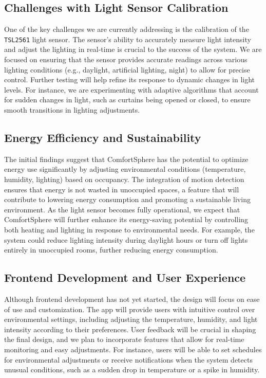 \documentclass[a4paper]{scrartcl}
\begin{document}
\subsection{Challenges with Light Sensor Calibration}  
One of the key challenges we are currently addressing is the calibration of the \texttt{TSL2561} light sensor. The sensor's ability to accurately measure light intensity and adjust the lighting in real-time is crucial to the success of the system. We are focused on ensuring that the sensor provides accurate readings across various lighting conditions (e.g., daylight, artificial lighting, night) to allow for precise control. Further testing will help refine its response to dynamic changes in light levels. For instance, we are experimenting with adaptive algorithms that account for sudden changes in light, such as curtains being opened or closed, to ensure smooth transitions in lighting adjustments.

\subsection{Energy Efficiency and Sustainability}  
The initial findings suggest that ComfortSphere has the potential to optimize energy use significantly by adjusting environmental conditions (temperature, humidity, lighting) based on occupancy. The integration of motion detection ensures that energy is not wasted in unoccupied spaces, a feature that will contribute to lowering energy consumption and promoting a sustainable living environment. As the light sensor becomes fully operational, we expect that ComfortSphere will further enhance its energy-saving potential by controlling both heating and lighting in response to environmental needs. For example, the system could reduce lighting intensity during daylight hours or turn off lights entirely in unoccupied rooms, further reducing energy consumption.

\subsection{Frontend Development and User Experience}  
Although frontend development has not yet started, the design will focus on ease of use and customization. The app will provide users with intuitive control over environmental settings, including adjusting the temperature, humidity, and light intensity according to their preferences. User feedback will be crucial in shaping the final design, and we plan to incorporate features that allow for real-time monitoring and easy adjustments. For instance, users will be able to set schedules for environmental adjustments or receive notifications when the system detects unusual conditions, such as a sudden drop in temperature or a spike in humidity.
\end{document}
